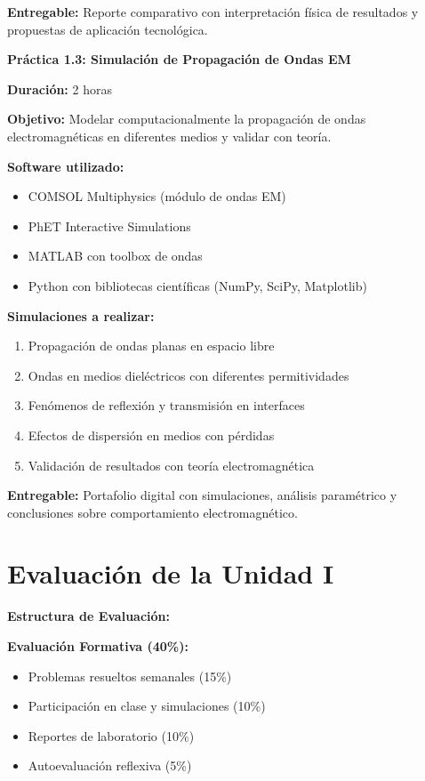 \begin{tecnologiabox}
\begin{tecnologiabox}
\begin{tecnologiabox}
\begin{teknologiabox}
\begin{practicabox}
\textbf{Entregable:} Reporte comparativo con interpretación física de resultados y propuestas de aplicación tecnológica.
\end{practicabox}

\begin{practicabox}
\textbf{Práctica 1.3: Simulación de Propagación de Ondas EM}

\textbf{Duración:} 2 horas

\textbf{Objetivo:} Modelar computacionalmente la propagación de ondas electromagnéticas en diferentes medios y validar con teoría.

\textbf{Software utilizado:}
\begin{itemize}
\item COMSOL Multiphysics (módulo de ondas EM)
\item PhET Interactive Simulations
\item MATLAB con toolbox de ondas
\item Python con bibliotecas científicas (NumPy, SciPy, Matplotlib)
\end{itemize}

\textbf{Simulaciones a realizar:}
\begin{enumerate}
\item Propagación de ondas planas en espacio libre
\item Ondas en medios dieléctricos con diferentes permitividades
\item Fenómenos de reflexión y transmisión en interfaces
\item Efectos de dispersión en medios con pérdidas
\item Validación de resultados con teoría electromagnética
\end{enumerate}

\textbf{Entregable:} Portafolio digital con simulaciones, análisis paramétrico y conclusiones sobre comportamiento electromagnético.
\end{practicabox}

\section{Evaluación de la Unidad I}

\begin{evaluacionbox}
\textbf{Estructura de Evaluación:}

\textbf{Evaluación Formativa (40\%):}
\begin{itemize}
\item Problemas resueltos semanales (15\%)
\item Participación en clase y simulaciones (10\%)
\item Reportes de laboratorio (10\%)
\item Autoevaluación reflexiva (5\%)
\end{itemize}


\end{evaluacionbox}
\end{teknologiabox}
\end{tecnologiabox}
\end{tecnologiabox}
\end{tecnologiabox}
